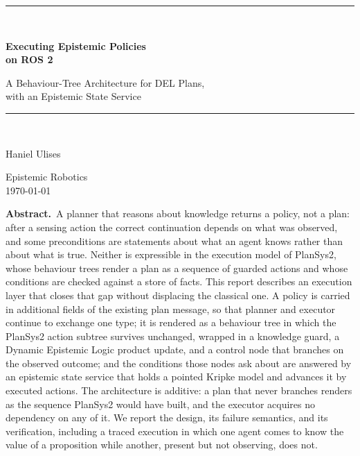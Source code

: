 \documentclass[11pt,a4paper]{article}
\theoremstyle{definition}
\begin{document}
\begin{titlepage}
\centering
\vspace*{2.4cm}
{\color{rulegrey}\rule{\textwidth}{0.8pt}}\\[0.9cm]
{\LARGE\bfseries Executing Epistemic Policies\\[0.25cm] on ROS 2\par}
\vspace{0.5cm}
{\large\color{slate} A Behaviour-Tree Architecture for DEL Plans,\\ with an Epistemic State Service\par}
\vspace{0.7cm}
{\color{rulegrey}\rule{\textwidth}{0.8pt}}\\[1.4cm]

{\large Haniel Ulises\par}
\vspace{0.3cm}
{\color{slate} Epistemic Robotics}\\
\vspace{0.15cm}
{\color{slate}\today}

\vfill
\begin{minipage}{0.86\textwidth}
\small\color{slate}
\textbf{Abstract.}\ A planner that reasons about knowledge returns a policy, not
a plan: after a sensing action the correct continuation depends on what was
observed, and some preconditions are statements about what an agent knows
rather than about what is true. Neither is expressible in the execution model
of PlanSys2, whose behaviour trees render a plan as a sequence of guarded
actions and whose conditions are checked against a store of facts. This report
describes an execution layer that closes that gap without displacing the
classical one. A policy is carried in additional fields of the existing plan
message, so that planner and executor continue to exchange one type; it is
rendered as a behaviour tree in which the PlanSys2 action subtree survives
unchanged, wrapped in a knowledge guard, a Dynamic Epistemic Logic product
update, and a control node that branches on the observed outcome; and the
conditions those nodes ask about are answered by an epistemic state service
that holds a pointed Kripke model and advances it by executed actions. The
architecture is additive: a plan that never branches renders as the sequence
PlanSys2 would have built, and the executor acquires no dependency on any of
it. We report the design, its failure semantics, and its verification,
including a traced execution in which one agent comes to know the value of a
proposition while another, present but not observing, does not.
\end{minipage}
\vspace{2cm}
\end{titlepage}
\end{document}
